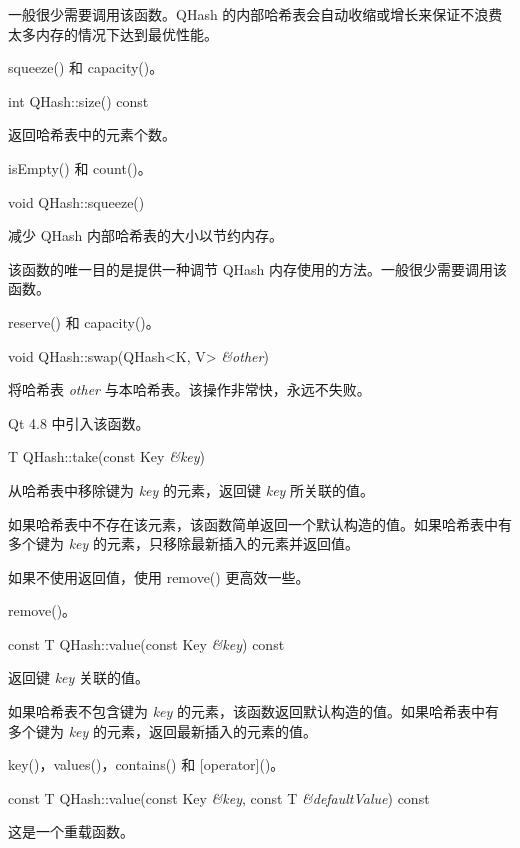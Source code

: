 一般很少需要调用该函数。QHash 的内部哈希表会自动收缩或增长来保证不浪费太多内存的情况下达到最优性能。

\begin{seeAlso}
squeeze() 和 capacity()。
\end{seeAlso}

int QHash::size() const

返回哈希表中的元素个数。

\begin{seeAlso}
isEmpty() 和 count()。
\end{seeAlso}

void QHash::squeeze()

减少 QHash 内部哈希表的大小以节约内存。

该函数的唯一目的是提供一种调节 QHash 内存使用的方法。一般很少需要调用该函数。

\begin{seeAlso}
reserve() 和 capacity()。
\end{seeAlso}

void QHash::swap(QHash<K, V> \emph{\&other})

将哈希表 \emph{other} 与本哈希表。该操作非常快，永远不失败。

Qt 4.8 中引入该函数。

T QHash::take(const Key \emph{\&key})

从哈希表中移除键为 \emph{key} 的元素，返回键 \emph{key} 所关联的值。

如果哈希表中不存在该元素，该函数简单返回一个默认构造的值。如果哈希表中有多个键为 \emph{key} 的元素，只移除最新插入的元素并返回值。

如果不使用返回值，使用 remove() 更高效一些。

\begin{seeAlso}
remove()。
\end{seeAlso}


const T QHash::value(const Key \emph{\&key}) const

返回键 \emph{key} 关联的值。

如果哈希表不包含键为 \emph{key} 的元素，该函数返回默认构造的值。如果哈希表中有多个键为 \emph{key} 的元素，返回最新插入的元素的值。

\begin{seeAlso}
key()，values()，contains() 和 [operator]()。
\end{seeAlso}

const T QHash::value(const Key \emph{\&key}, const T \emph{\&defaultValue}) const

这是一个重载函数。

